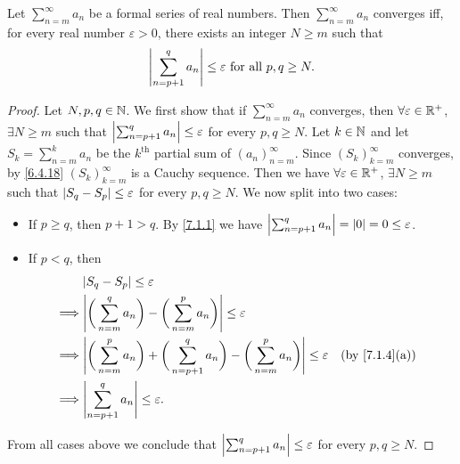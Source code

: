 \setcounter{thm}{4}
\begin{prop}\label{7.2.5}
  Let \(\sum_{n = m}^\infty a_n\) be a formal series of real numbers.
  Then \(\sum_{n = m}^\infty a_n\) converges iff, for every real number \(\varepsilon > 0\), there exists an integer \(N \geq m\) such that
  \[
    \left\lvert\sum_{n = p + 1}^q a_n\right\rvert \leq \varepsilon \text{ for all } p, q \geq N.
  \]
\end{prop}

\begin{proof}
  Let \(N, p, q \in \mathbb{N}\).
  We first show that if \(\sum_{n = m}^\infty a_n\) converges, then \(\forall \varepsilon \in \mathbb{R}^+\), \(\exists N \geq m\) such that \(\left\lvert\sum_{n = p + 1}^q a_n\right\rvert \leq \varepsilon\) for every \(p, q \geq N\).
  Let \(k \in \mathbb{N}\) and let \(S_k = \sum_{n = m}^k a_n\) be the \(k^{\text{th}}\) partial sum of \((a_n)_{n = m}^\infty\).
  Since \((S_k)_{k = m}^\infty\) converges, by \cref{6.4.18} \((S_k)_{k = m}^\infty\) is a Cauchy sequence.
  Then we have \(\forall \varepsilon \in \mathbb{R}^+\), \(\exists N \geq m\) such that \(\left\lvert S_q - S_p\right\rvert \leq \varepsilon\) for every \(p, q \geq N\).
  We now split into two cases:
  \begin{itemize}
    \item If \(p \geq q\), then \(p + 1 > q\).
          By \cref{7.1.1} we have \(\left\lvert\sum_{n = p + 1}^q a_n\right\rvert = \left\lvert0\right\rvert = 0 \leq \varepsilon\).
    \item If \(p < q\), then
          \begin{align*}
                     & \abs{S_q - S_p} \leq \varepsilon                                                                                                               \\
            \implies & \abs{\bigg(\sum_{n = m}^q a_n\bigg) - \bigg(\sum_{n = m}^p a_n\bigg)} \leq \varepsilon                                                         \\
            \implies & \abs{\bigg(\sum_{n = m}^p a_n\bigg) + \bigg(\sum_{n = p + 1}^q a_n\bigg) - \bigg(\sum_{n = m}^p a_n\bigg)} \leq \varepsilon &  & \by{7.1.4}[a] \\
            \implies & \abs{\sum_{n = p + 1}^q a_n} \leq \varepsilon.
          \end{align*}
  \end{itemize}
  From all cases above we conclude that \(\left\lvert\sum_{n = p + 1}^q a_n\right\rvert \leq \varepsilon\) for every \(p, q \geq N\).


\end{proof}
